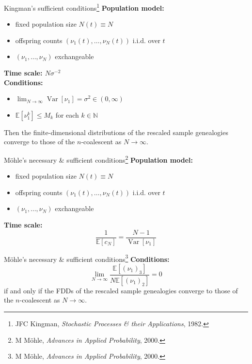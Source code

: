 \documentclass[aspectratio=169,fleqn]{beamer}
\theoremstyle{definition}
\newcommand{\E}{\mathbb{E}}
\newcommand{\V}{\operatorname{Var}}
\begin{document}
\begin{frame}{Kingman's sufficient conditions\footnote[frame]{JFC Kingman, \textit{Stochastic Processes \& their Applications}, 1982.}}
    \textbf{Population model:}
	\begin{itemize}
	\item fixed population size $N(t) \equiv N$
	\item offspring counts $(\nu_1(t), \dots, \nu_N(t))$ i.i.d. over $t$
	\item $(\nu_1, \dots, \nu_N)$ exchangeable
	\end{itemize}
	\pause
	\textbf{Time scale: $N\sigma^{-2}$} \\
	\pause
	\textbf{Conditions:}
	\begin{itemize}
	\item $\lim_{N\to\infty} \V[\nu_1] = \sigma^2 \in (0,\infty)$
	\item $\E[\nu_1^k] \leq M_k$ for each $k\in\mathbb{N}$
	\end{itemize}
	\pause
	Then the finite-dimensional distributions of the rescaled sample genealogies converge to those of the $n$-coalescent as $N\to\infty$.
\end{frame}


\begin{frame}{M\"ohle's necessary \& sufficient conditions\footnote[frame]{M M\"ohle, \textit{Advances in Applied Probability}, 2000.}}
    \textbf{Population model:}
	\begin{itemize}
	\item fixed population size $N(t) \equiv N$
	\item offspring counts $(\nu_1(t), \dots, \nu_N(t))$ i.i.d. over $t$
	\item $(\nu_1, \dots, \nu_N)$ exchangeable
	\end{itemize}
	\pause
	\textbf{Time scale:} 
	\begin{equation*}
	\frac{1}{\E[c_N]} = \frac{N-1}{\V[\nu_1]}
	\end{equation*}
\end{frame}
\addtocounter{footnote}{-1}
\begin{frame}{M\"ohle's necessary \& sufficient conditions\footnote[frame]{M M\"ohle, \textit{Advances in Applied Probability}, 2000.}}
	\textbf{Conditions:}
	\begin{equation*}
	\lim_{N\to\infty} \frac{\E[(\nu_1)_3]}{N\E[(\nu_1)_2]} =0 
	\end{equation*}
	\pause
	if and only if the FDDs of the rescaled sample genealogies converge to those of the $n$-coalescent as $N\to\infty$.
\end{frame}
\end{document}
